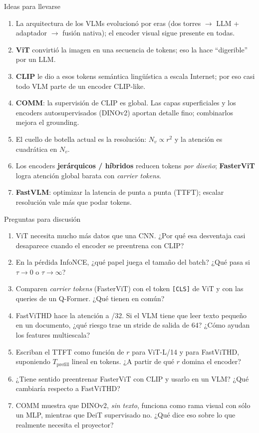 \documentclass[aspectratio=169,10pt]{beamer}
\begin{document}
\begin{frame}{Ideas para llevarse}
  \begin{enumerate}\small
    \item La arquitectura de los VLMs \alert{evolucionó por eras} (dos torres $\to$ LLM + adaptador $\to$ fusión nativa); el encoder visual sigue presente en todas.
    \item \textbf{ViT} convirtió la imagen en una secuencia de tokens; eso la hace ``digerible'' por un LLM.
    \item \textbf{CLIP} le dio a esos tokens \alert{semántica lingüística} a escala Internet; por eso casi todo VLM parte de un encoder CLIP-like.
    \item \textbf{COMM}: la supervisión de CLIP es global. Las \alert{capas superficiales} y los encoders autosupervisados (\alert{DINOv2}) aportan detalle fino; combinarlos mejora el grounding.
    \item El cuello de botella actual es la \alert{resolución}: $N_v\propto r^2$ y la atención es cuadrática en $N_v$.
    \item Los encoders \textbf{jerárquicos / híbridos} reducen tokens \emph{por diseño}; \textbf{FasterViT} logra atención global barata con \emph{carrier tokens}.
    \item \textbf{FastVLM}: optimizar la \alert{latencia de punta a punta} (TTFT); escalar resolución vale más que podar tokens.
  \end{enumerate}
\end{frame}

\begin{frame}{Preguntas para discusión}
  \begin{enumerate}\small
    \item ViT necesita mucho más datos que una CNN. ¿Por qué esa desventaja casi desaparece cuando el encoder se preentrena con CLIP?
    \item En la pérdida InfoNCE, ¿qué papel juega el tamaño del batch? ¿Qué pasa si $\tau\to0$ o $\tau\to\infty$?
    \item Comparen \emph{carrier tokens} (FasterViT) con el token \texttt{[CLS]} de ViT y con las queries de un Q-Former. ¿Qué tienen en común?
    \item FastViTHD hace la atención a /32. Si el VLM tiene que leer texto pequeño en un documento, ¿qué riesgo trae un stride de salida de 64? ¿Cómo ayudan los features multiescala?
    \item Escriban el TTFT como función de $r$ para ViT-L/14 y para FastViTHD, suponiendo $T_{\text{prefill}}$ lineal en tokens. ¿A partir de qué $r$ domina el encoder?
    \item ¿Tiene sentido preentrenar FasterViT con CLIP y usarlo en un VLM? ¿Qué cambiaría respecto a FastViTHD?
    \item COMM muestra que DINOv2, \emph{sin texto}, funciona como rama visual con sólo un MLP, mientras que DeiT supervisado no. ¿Qué dice eso sobre lo que realmente necesita el proyector?
  \end{enumerate}
\end{frame}
\end{document}
